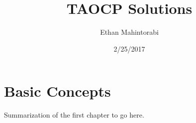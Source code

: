\documentclass{article}
\title{TAOCP Solutions}
\author{Ethan Mahintorabi}
\date{2/25/2017}
\begin{document}
  \maketitle

  \section{Basic Concepts}
  Summarization of the first chapter to go here.
  
\end{document}

